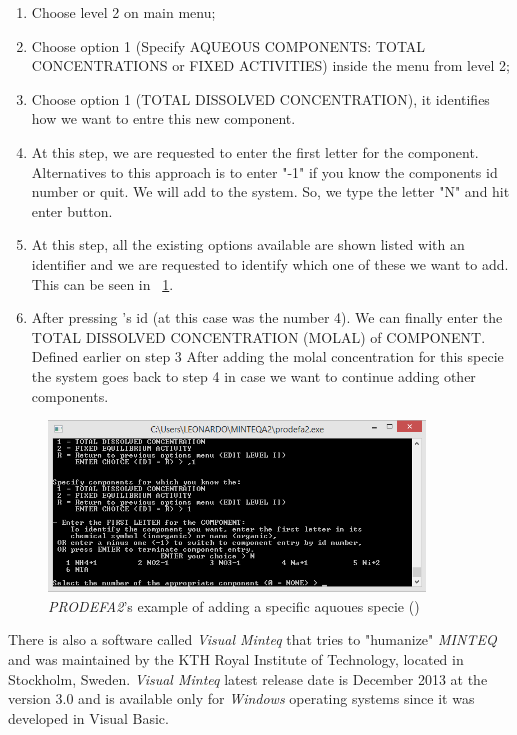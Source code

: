 \documentclass[ppgc,mestrado,english]{iiufrgs}
\begin{document}
\begin{enumerate}
\item Choose level 2 on main menu;
\item Choose option 1 (Specify AQUEOUS COMPONENTS: TOTAL CONCENTRATIONS or FIXED ACTIVITIES) inside the menu from level 2;
\item Choose option 1 (TOTAL DISSOLVED CONCENTRATION), it identifies how we want to entre this new component.
\item At this step, we are requested to enter the first letter for the component. Alternatives to this approach is to enter "-1" if you know the components id number or quit. We will add  to the system. So, we type the letter "N" and hit enter button.
\item At this step, all the existing options available are shown listed with an identifier and we are requested to identify which one of these we want to add. This can be seen in ~\ref{minteq:Na+}.
\item After pressing 's id (at this case was the number 4). We can finally enter the TOTAL DISSOLVED CONCENTRATION (MOLAL) of COMPONENT. Defined earlier on step 3 After adding the molal concentration for this specie the system goes back to step 4 in case we want to continue adding other components.
\end{enumerate}

\begin{figure}[ht!]
\centering
\includegraphics[width=100mm]{minteq-Na+.png}
\caption{\emph{PRODEFA2}'s example of adding a specific aquoues specie () }
\label{minteq:Na+}
\end{figure}

There is also a software called \emph{Visual Minteq} that tries to "humanize" \emph{MINTEQ} and was maintained by the KTH Royal Institute of Technology, located in Stockholm, Sweden. \emph{Visual Minteq} latest release date is December 2013 at the version 3.0 and is available only for \emph{Windows} operating systems since it was developed in Visual Basic. 
\end{document}
